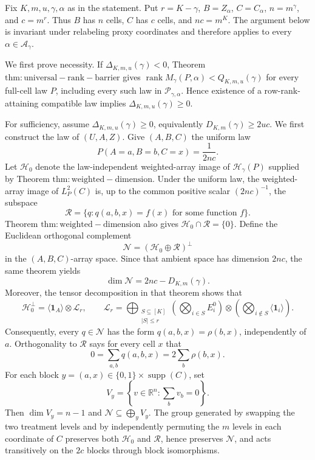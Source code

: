 Fix \(K,m,u,\gamma,\alpha\) as in the statement. Put \(r=K-\gamma\), \(B=Z_\alpha\), \(C=C_\alpha\), \(n=m^\gamma\), and \(c=m^r\). Thus \(B\) has \(n\) cells, \(C\) has \(c\) cells, and \(nc=m^K\). The argument below is invariant under relabeling proxy coordinates and therefore applies to every \(\alpha\in\mathcal A_\gamma\).

We first prove necessity. If \(\Delta_{K,m,u}(\gamma)<0\), Theorem \(\mathrm{thm:universal-rank-barrier}\) gives \(\operatorname{rank}M_\gamma(P,\alpha)<Q_{K,m,u}(\gamma)\) for every full-cell law \(P\), including every such law in \(\mathcal P_{\gamma,\alpha}\). Hence existence of a row-rank-attaining compatible law implies \(\Delta_{K,m,u}(\gamma)\ge0\).

For sufficiency, assume \(\Delta_{K,m,u}(\gamma)\ge0\), equivalently \(D_{K,m}(\gamma)\ge2uc\). We first construct the law of \((U,A,Z)\). Give \((A,B,C)\) the uniform law
\[P(A=a,B=b,C=x)=\frac{1}{2nc}.\]
Let \(\mathcal H_0\) denote the law-independent weighted-array image of \(\mathcal H_\gamma(P)\) supplied by Theorem \(\mathrm{thm:weighted-dimension}\). Under the uniform law, the weighted-array image of \(L_P^2(C)\) is, up to the common positive scalar \((2nc)^{-1}\), the subspace
\[\mathcal R=\{q:q(a,b,x)=f(x)\text{ for some function }f\}.\]
Theorem \(\mathrm{thm:weighted-dimension}\) also gives \(\mathcal H_0\cap\mathcal R=\{0\}\). Define the Euclidean orthogonal complement
\[\mathcal N=(\mathcal H_0\oplus\mathcal R)^\perp\]
in the \((A,B,C)\)-array space. Since that ambient space has dimension \(2nc\), the same theorem yields
\[\dim\mathcal N=2nc-D_{K,m}(\gamma).\]
Moreover, the tensor decomposition in that theorem shows that
\[\mathcal H_0^\perp=\langle\mathbf1_A\rangle\otimes\mathcal L_r,\qquad \mathcal L_r=\bigoplus_{\substack{S\subseteq[K]\\|S|\le r}}\left(\bigotimes_{i\in S}E_i^0\right)\otimes\left(\bigotimes_{i\notin S}\langle\mathbf1_i\rangle\right).\]
Consequently, every \(q\in\mathcal N\) has the form \(q(a,b,x)=\rho(b,x)\), independently of \(a\). Orthogonality to \(\mathcal R\) says for every cell \(x\) that
\[0=\sum_{a,b}q(a,b,x)=2\sum_b\rho(b,x).\]
For each block \(y=(a,x)\in\{0,1\}\times\operatorname{supp}(C)\), set
\[V_y=\left\{v\in\mathbb R^n:\sum_bv_b=0\right\}.\]
Then \(\dim V_y=n-1\) and \(\mathcal N\subseteq\bigoplus_yV_y\). The group generated by swapping the two treatment levels and by independently permuting the \(m\) levels in each coordinate of \(C\) preserves both \(\mathcal H_0\) and \(\mathcal R\), hence preserves \(\mathcal N\), and acts transitively on the \(2c\) blocks through block isomorphisms.

